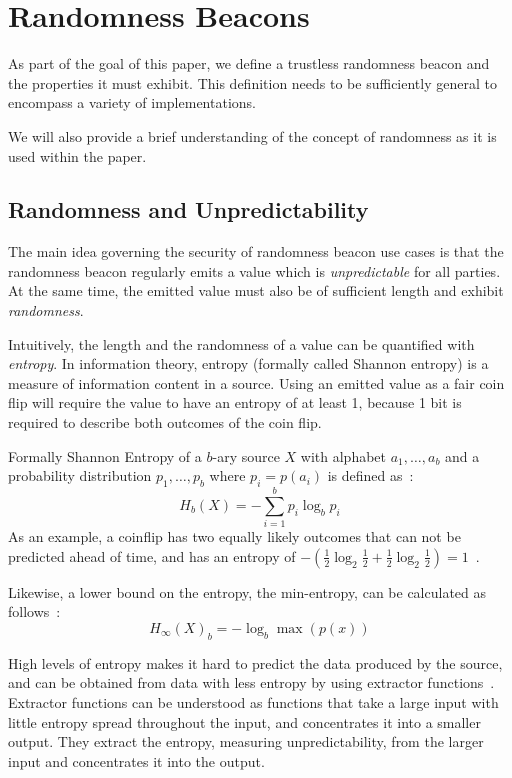 \section{Randomness Beacons}\label{sec:beacons}

As part of the goal of this paper, we define a trustless randomness beacon and the properties it must exhibit.
This definition needs to be sufficiently general to encompass a variety of implementations.

We will also provide a brief understanding of the concept of randomness as it is used within the paper.

\subsection{Randomness and Unpredictability}\label{sub:beacons_randomness}
The main idea governing the security of randomness beacon use cases is that the randomness beacon regularly emits a value which is \emph{unpredictable} for all parties. At the same time, the emitted value must also be of sufficient length and exhibit \emph{randomness}.

Intuitively, the length and the randomness of a value can be quantified with \emph{entropy}. In information theory, entropy (formally called Shannon entropy) is a measure of information content in a source. Using an emitted value as a fair coin flip will require the value to have an entropy of at least 1, because 1 bit is required to describe both outcomes of the coin flip.

Formally Shannon Entropy of a $b$-ary source $X$ with alphabet ${a_1, \ldots, a_b}$ and a probability distribution ${p_1, \ldots , p_b}$ where $p_i = p(a_i)$ is defined as~\cite{informationtheory}:
$$
H_{b} (X) = -\sum\limits_{i = 1}^b p_{i}\log_{b} p_{i}
$$
As an example, a coinflip has two equally likely outcomes that can not be predicted ahead of time, and has an entropy of $-(\frac{1}{2}\log_2 \frac{1}{2} + \frac{1}{2}\log_2 \frac{1}{2}) = 1$~\cite{informationtheory}.

Likewise, a lower bound on the entropy, the min-entropy, can be calculated as follows~\cite{informationtheory}:
$$
H_\infty(X)_{b} = -\log_{b}\max(p(x))
$$

High levels of entropy makes it hard to predict the data produced by the source, and can be obtained from data with less entropy by using extractor functions~\cite{pseudorandomness}. Extractor functions can be understood as functions that take a large input with little entropy spread throughout the input, and concentrates it into a smaller output. They extract the entropy, measuring unpredictability, from the larger input and concentrates it into the output.

